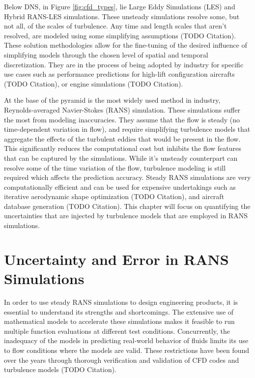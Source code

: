 Below DNS, in Figure \ref{fig:cfd_types}, lie Large Eddy Simulations (LES) and Hybrid RANS-LES simulations. These unsteady simulations resolve some, but not all, of the scales of turbulence. Any time and length scales that aren't resolved, are modeled using some simplifying assumptions (TODO Citation). These solution methodologies allow for the fine-tuning of the desired influence of simplifying models through the chosen level of spatial and temporal discretization. They are in the process of being adopted by industry for specific use cases such as performance predictions for high-lift configuration aircrafts (TODO Citation), or engine simulations (TODO Citation). 

At the base of the pyramid is the most widely used method in industry, Reynolds-averaged Navier-Stokes (RANS) simulation. These simulations suffer the most from modeling inaccuracies. They assume that the flow is steady (no time-dependent variation in flow), and require simplifying turbulence models that aggregate the effects of the turbulent eddies that would be present in the flow. This significantly reduces the computational cost but inhibits the flow features that can be captured by the simulations. While it's unsteady counterpart can resolve some of the time variation of the flow, turbulence modeling is still required which affects the prediction accuracy. Steady RANS simulations are very computationally efficient and can be used for expensive undertakings such as iterative aerodynamic shape optimization (TODO Citation), and aircraft database generation (TODO Citation). This chapter will focus on quantifying the uncertainties that are injected by turbulence models that are employed in RANS simulations. 

\section{Uncertainty and Error in RANS Simulations}

In order to use steady RANS simulations to design engineering products, it is essential to understand its strengths and shortcomings. The extensive use of mathematical models to accelerate these simulations makes it feasible to run multiple function evaluations at different test conditions. Concurrently, the inadequacy of the models in predicting real-world behavior of fluids limits its use to flow conditions where the models are valid. These restrictions have been found over the years through thorough verification and validation of CFD codes and turbulence models (TODO Citation). 

